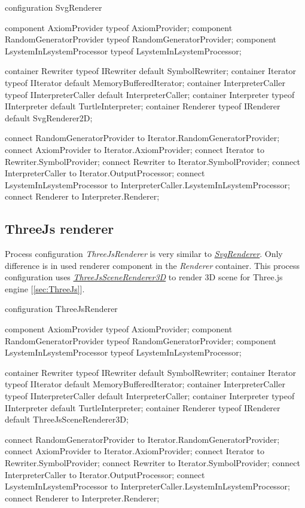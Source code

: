 \begin{LsystemBreak}
configuration SvgRenderer {
	component AxiomProvider typeof AxiomProvider;
	component RandomGeneratorProvider
		typeof RandomGeneratorProvider;
	component LsystemInLsystemProcessor
		typeof LsystemInLsystemProcessor;

	container Rewriter typeof IRewriter default SymbolRewriter;
	container Iterator typeof IIterator
		default MemoryBufferedIterator;
	container InterpreterCaller typeof IInterpreterCaller
		default InterpreterCaller;
	container Interpreter typeof IInterpreter
		default TurtleInterpreter;
	container Renderer typeof IRenderer default SvgRenderer2D;

	connect RandomGeneratorProvider
		to Iterator.RandomGeneratorProvider;
	connect AxiomProvider to Iterator.AxiomProvider;
	connect Iterator to Rewriter.SymbolProvider;
	connect Rewriter to Iterator.SymbolProvider;
	connect InterpreterCaller to Iterator.OutputProcessor;
	connect LsystemInLsystemProcessor
		to InterpreterCaller.LsystemInLsystemProcessor;
	connect Renderer to Interpreter.Renderer;
}
\end{LsystemBreak}


\subsection{ThreeJs renderer}
\label{configurationThreeJsRenderer}

Process configuration \emph{ThreeJsRenderer} is very similar to \hyperref[configurationSvgRenderer]{\emph{SvgRenderer}}.
Only difference is in used renderer component in the \emph{Renderer} container.
This process configuration uses \hyperref[Malsys.Processing.Components.Renderers.ThreeJsSceneRenderer3D]{\emph{ThreeJsSceneRenderer3D}} to render 3D scene for Three.js engine [\ref{sec:ThreeJs}].

\begin{LsystemBreak}
configuration ThreeJsRenderer {
	component AxiomProvider typeof AxiomProvider;
	component RandomGeneratorProvider
		typeof RandomGeneratorProvider;
	component LsystemInLsystemProcessor
		typeof LsystemInLsystemProcessor;

	container Rewriter typeof IRewriter default SymbolRewriter;
	container Iterator typeof IIterator
		default MemoryBufferedIterator;
	container InterpreterCaller typeof IInterpreterCaller
		default InterpreterCaller;
	container Interpreter typeof IInterpreter
		default TurtleInterpreter;
	container Renderer typeof IRenderer
		default ThreeJsSceneRenderer3D;

	connect RandomGeneratorProvider
		to Iterator.RandomGeneratorProvider;
	connect AxiomProvider to Iterator.AxiomProvider;
	connect Iterator to Rewriter.SymbolProvider;
	connect Rewriter to Iterator.SymbolProvider;
	connect InterpreterCaller to Iterator.OutputProcessor;
	connect LsystemInLsystemProcessor
		to InterpreterCaller.LsystemInLsystemProcessor;
	connect Renderer to Interpreter.Renderer;
}
\end{LsystemBreak}


